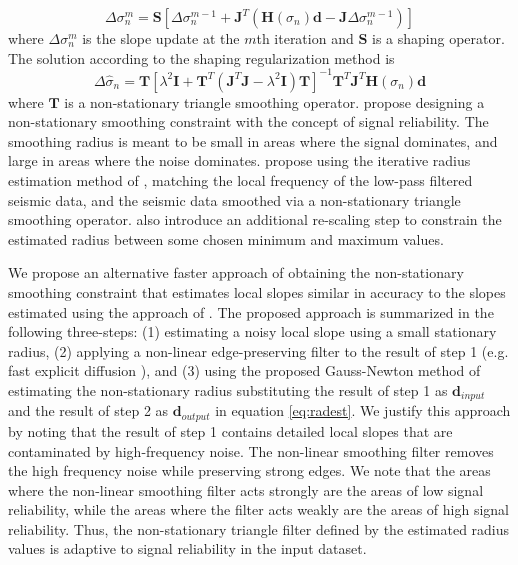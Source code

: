 \begin{equation}
\Delta\sigma_{n}^{m}=\mathbf{S}[\Delta\sigma_{n}^{m-1}+\mathbf{J}^T(\mathbf{H}(\sigma_{n})\mathbf{d}-\mathbf{J}\Delta\sigma_{n}^{m-1})]
\label{eq:slopeshap}
\end{equation}
where $\Delta\sigma_n^m$ is the slope update at the $m$th iteration and $\mathbf{S}$ is a shaping operator. The solution according to the shaping regularization method is 
\begin{equation}
\Delta\hat{\sigma}_{n}=\mathbf{T}[\lambda^2\mathbf{I}+\mathbf{T}^T(\mathbf{J}^T\mathbf{J}-\lambda^2\mathbf{I})\mathbf{T}]^{-1}\mathbf{T}^T\mathbf{J}^T\mathbf{H}(\sigma_n)\mathbf{d}
\label{eq:slopeshap}
\end{equation}
where $\mathbf{T}$ is a non-stationary triangle smoothing operator. 
\cite{wang2021} propose designing a non-stationary smoothing constraint with the concept of signal reliability. The smoothing radius is meant to be small in areas where the signal dominates, and large in areas where the noise dominates. \cite{wang2021} propose using the iterative radius estimation method of \cite{greerfomel2018}, matching the local frequency of the low-pass filtered seismic data, and the seismic data smoothed via a non-stationary triangle smoothing operator. \cite{wang2021} also introduce an additional re-scaling step to constrain the estimated radius between some chosen minimum and maximum values. 

We propose an alternative faster approach of obtaining the non-stationary smoothing constraint that estimates local slopes similar in accuracy to the slopes estimated using the approach of \cite{wang2021}. The proposed approach is summarized in the following three-steps: (1) estimating a noisy local slope using a small stationary radius, (2) applying a non-linear edge-preserving filter to the result of step 1 (e.g. fast explicit diffusion \cite[]{grewenig2010}), and (3) using the proposed Gauss-Newton method of estimating the non-stationary radius substituting the result of step 1 as $\mathbf{d}_{input}$ and the result of step 2 as $\mathbf{d}_{output}$ in equation \ref{eq:radest}. We justify this approach by noting that the result of step 1 contains detailed local slopes that are contaminated by high-frequency noise. The non-linear smoothing filter removes the high frequency noise while preserving strong edges. We note that the areas where the non-linear smoothing filter acts strongly are the areas of low signal reliability, while the areas where the filter acts weakly are the areas of high signal reliability. Thus, the non-stationary triangle filter defined by the estimated radius values is adaptive to signal reliability in the input dataset. 

